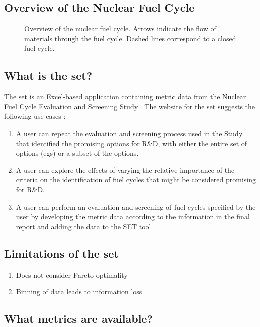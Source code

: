 \subsection{Overview of the Nuclear Fuel Cycle}

\begin{figure}[htbp!]
  \centering
  \resizebox{\columnwidth}{!}{}
  \caption{Overview of the nuclear fuel cycle. Arrows indicate the flow of materials through the fuel cycle. 
  Dashed lines correspond to a closed fuel cycle.}
  \label{fig:nuclear-fuel-cycle}
\end{figure}

\subsection{What is the \ac{set}?}

The \ac{set} is an Excel-based application containing metric data from the Nuclear Fuel Cycle Evaluation and Screening Study
\cite{wigeland_nuclear_2014}. The website for the \ac{set} suggests the following use cases \cite{pincock_screening_2014}:
\begin{enumerate}
    \item A user can repeat the evaluation and screening process used in the Study that identified the promising options for R\&D, with either the entire set of options (\acp{eg}) or a subset of the options.
    \item A user can explore the effects of varying the relative importance of the criteria on the identification of fuel cycles that might be considered promising for R\&D.
    \item A user can perform an evaluation and screening of fuel cycles specified by the user by developing the metric data according to the information in the final report and adding the data to the SET tool.
\end{enumerate}

\subsection{Limitations of the \ac{set}}
\begin{enumerate}
    \item Does not consider Pareto optimality
    \item Binning of data leads to information loss
\end{enumerate}

\subsection{What metrics are available?}


